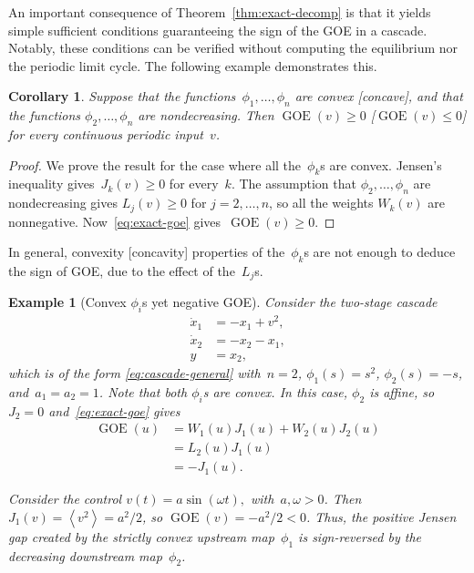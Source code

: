 \documentclass[onecolumn]{IEEEtran}
\newcommand{\GOE}{\operatorname{GOE}}
\newcommand{\avg}[1]{\left\langle #1\right\rangle}
\newtheorem{corollary}[theorem]{Corollary}
\newtheorem{example}[theorem]{Example}
\begin{document}
An important consequence of Theorem~\ref{thm:exact-decomp} is that it yields simple sufficient conditions guaranteeing the sign of the GOE in a cascade. Notably, these conditions can be verified without computing the equilibrium nor the periodic limit cycle. The following example demonstrates this.

 
 
\begin{corollary}
\label{cor:sign}
Suppose that  the functions~$\phi_1,\ldots,\phi_n$ are convex [concave], and that the functions 
$\phi_2,\ldots,\phi_n$ are nondecreasing. Then
    $\GOE(v) \geq 0$
[$\GOE(v)\leq 0$] for every continuous periodic input~$v$. 
\end{corollary}

\begin{proof}
We prove the result for the case where all the~$\phi_k$s are convex.   Jensen's inequality 
gives~$J_k(v)\geq0$ for every~$k$.
The assumption that $\phi_2,\ldots,\phi_n$ are nondecreasing gives   
  $L_j(v)\geq0$ for $j=2,\ldots,n$, so all the weights
$W_k(v)$ are nonnegative. Now~\eqref{eq:exact-goe}  gives~$\GOE(v)\geq0$.
\end{proof}

In general, convexity [concavity]  properties of the~$\phi_k$s are not enough to deduce the sign of GOE, due to the effect of the~$L_j$s.  
\begin{example}[Convex $\phi_i$s yet negative GOE]
\label{exa:negative}
Consider the two-stage cascade
\begin{align*}
    \dot x_1
    &=
    -x_1+v^2,
   \\
    \dot x_2
    &=
    -x_2-x_1,\\
 y&=x_2, 
\end{align*}
which is   of the form
\eqref{eq:cascade-general} with~$n=2$, 
$\phi_1(s)=s^2$, $\phi_2(s)=-s$, and~$a_1=a_2=1$.
 Note that both $\phi_i$s
are convex. 
In this case, $\phi_2$ is affine, so~$J_2=0$
and~\eqref{eq:exact-goe} 
gives
\begin{align*}
    \GOE (u) &= W_1(u) J_1(u)+W_2(u) J_2(u) \\
          &=     L_2(u) J_1(u)\\
          &=-J_1(u).
\end{align*}


Consider the control
$
    v(t)=a\sin(\omega t),
 $ with~$    a,\omega>0$.  Then 
 $
    J_1(v)
    =
    \avg{v^2}
    =
    a^2/2$,
    so $
    \GOE(v)
    =
    - {a^2}/{2}
    <0$.
Thus, the positive Jensen gap created by the strictly convex upstream map~$\phi_1$ is sign-reversed by the decreasing downstream map~$\phi_2$.
\end{example}
\end{document}
